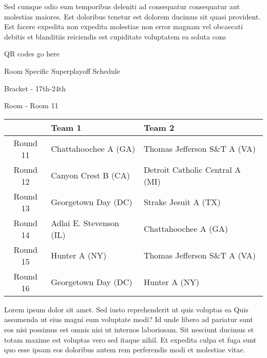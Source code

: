 \documentclass{article}%
\begin{document}
\newline%
    Sed cumque odio eum temporibus deleniti ad consequatur consequatur aut molestias maiores. Est doloribus tenetur est dolorem ducimus sit quasi provident. Est facere expedita non expedita molestiae non error magnam vel obcaecati debitis et blanditiis reiciendis est cupiditate voluptatem ea soluta cons%
\vspace*{140pt}%
\begin{center}%
\begin{Huge}%
QR codes go here%
\end{Huge}%
\end{center}%
\newpage%
\begin{center}%
\begin{Huge}%
Room Specific Superplayoff Schedule%
\end{Huge}%
\vspace*{8pt}%
\linebreak%
\begin{Large}%
Bracket {-} 17th{-}24th%
\end{Large}%
\vspace*{8pt}%
\linebreak%
\vspace*{8pt}%
\begin{Large}%
Room {-} Room 11%
\end{Large}%
\end{center}%
%
\begin{tabularx}{\textwidth}{|c|Y|Y|}%
\hline%
&Team 1&Team 2\\%
\hline%
Round 11&Chattahoochee A (GA)&Thomas Jefferson S\&T A (VA)\\%
Round 12&Canyon Crest B (CA)&Detroit Catholic Central A (MI)\\%
Round 13&Georgetown Day (DC)&Strake Jesuit A (TX)\\%
Round 14&Adlai E. Stevenson (IL)&Chattahoochee A (GA)\\%
Round 15&Hunter A (NY)&Thomas Jefferson S\&T A (VA)\\%
Round 16&Georgetown Day (DC)&Hunter A (NY)\\%
\hline%
\end{tabularx}%
\vspace*{8pt}%
\newline%
    Lorem ipsum dolor sit amet. Sed iusto reprehenderit ut quis voluptas ea Quis assumenda ut eius magni eum voluptate modi? Id unde libero ad pariatur sunt eos nisi possimus est omnis nisi ut internos laboriosam. Sit nesciunt ducimus et totam maxime est voluptas vero sed itaque nihil. Et expedita culpa et fuga sunt quo esse ipsam eos doloribus autem rem perferendis modi et molestiae vitae.\newline%
\end{document}
